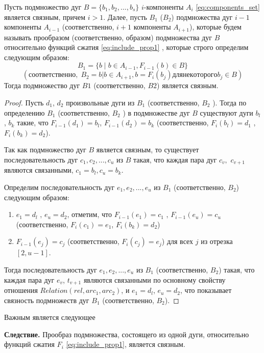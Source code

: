 \begin{lemma}
Пусть подмножество дуг $B = \{b_1, b_2, ..., b_s\}$  $i$-компоненты $A_i$ \ref{eq:components_set}  является связным, причем  $i > 1$.  Далее, пусть  $B_1$ ($B_2$) подмножества дуг $i-1$ компоненты $A_{i-1}$  (соответственно,  $i+1$ компоненты $A_{i+1}$), которые будем   называть прообразом  (соответственно,  образом)  подмножества  дуг $B$ относительно функций сжатия \ref{eq:include_prop1} , которые строго определим следующим образом: 
$$B_1 = \{b\; |\; b \in A_{i-1}, F_{i-1} (b) \in B \} $$
$$(\text{соответственно},\; B_2 = {b | b \in A_{i+1} , b  = F_i (b_j)  для некоторого b_j \in B })$$
Тогда подмножество дуг  $B1$ (соответственно,   $B2$) является связным.
\end{lemma}
\begin{proof}
Пусть  $d_1$, $d_2$   произвольные дуги из $B_1$  (соответственно, $B_2$ ). Тогда по определению $B_1$  (соответственно,   $B_2$ ) в подмножестве дуг $B$ существуют  дуги  $b_l$, $b_k$  такие, что $F_{i-1}(d_1) = b_l$, $F_{i-1} (d_2) = b_k$ (соответственно,  $F_i (b_l) = d_1$ , $F_i (b_k) = d_2$).

Так как  подмножество дуг $B$ является связным, то  существует последовательность дуг  $c_1, c_2, ..., c_u$  из   $B$ такая, что  каждая пара дуг $c_v,$ $c_{v+1}$ являются связанными,  $c_1 = b_l , c_u = b_k$. 

Определим  последовательность дуг $e_1, e_2, ..., e_u$ из $B_1$ (соответственно, $B_2$) следующим образом:
\begin{enumerate}
\item $e_1 = d_l$ , $e_u = d_2$, отметим, что $F_{i-1} (e_1) = c_1$ , $F_{i-1} (e_u) = c_u$ (соответственно,  $F_i (c_1) = e_1$, $F_i(b_k) = d_2$)
\item $F_{i-1}(e_j) = c_j$  (соответственно,  $F_i (c_j) = e_j$)   для всех $j$  из отрезка  
$[2, u - 1]$.
\end{enumerate}
Тогда  последовательность дуг $e_1, e_2, ..., e_u$ из $B_1$ (соответственно, $B_2$) такая, что  каждая пара дуг $e_v$, $t_{v+1}$ являются связанными по основному свойству отношения $Relation(rel, arc_1, arc_2)$, и  $e_1 = d_l$, $e_u = d_2$, что показывает связность подмножеств дуг $B_1$ (соответственно, $B_2$).
\end{proof}

Важным является следующее  
       
\textbf{Следствие.}
Прообраз  подмножества, состоящего из одной дуги, относительно функций сжатия  $F_i$ \ref{eq:include_prop1}, является связным.


